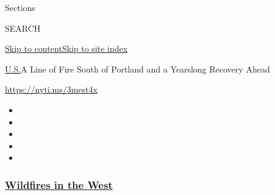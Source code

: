 Sections

SEARCH

\protect\hyperlink{site-content}{Skip to
content}\protect\hyperlink{site-index}{Skip to site index}

\href{/section/us}{U.S.}\textbar{}A Line of Fire South of Portland and a
Yearslong Recovery Ahead

\url{https://nyti.ms/3mest4x}

\begin{itemize}
\item
\item
\item
\item
\item
\end{itemize}

\hypertarget{wildfires-in-the-west}{%
\subsubsection{\texorpdfstring{\href{https://www.nytimes3xbfgragh.onion/spotlight/california-wildfires?name=styln-california-wildfires\&region=TOP_BANNER\&block=storyline_menu_recirc\&action=click\&pgtype=Article\&impression_id=964aa140-f4b6-11ea-bc0c-2dd0f27298e1\&variant=undefined}{Wildfires
in the West}}{Wildfires in the West}}\label{wildfires-in-the-west}}

